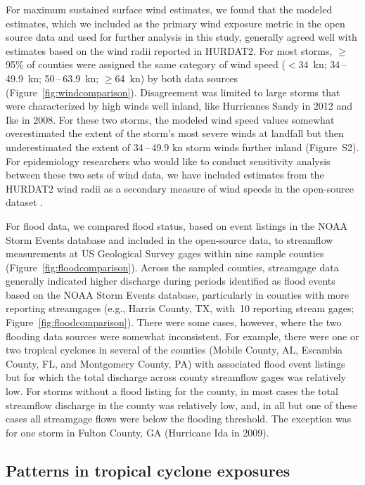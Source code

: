 For maximum sustained surface wind estimates, we found that the modeled
estimates, which we included as the primary wind exposure metric in the open
source data and used for further analysis in this study, generally agreed well
with estimates based on the wind radii reported in \ac{HURDAT2}. For most
storms, $\ge$95\% of counties were assigned the same category of wind speed
($<$34~\si{\knot}; 34\,--\,49.9~\si{\knot}; 50\,--\,63.9~\si{\knot};
$\ge$64~\si{\knot}) by both data sources (Figure~\ref{fig:windcomparison}).
Disagreement was limited to large storms that were characterized by high winds
well inland, like Hurricanes Sandy in 2012 and Ike in 2008. For these two
storms, the modeled wind speed values somewhat overestimated the extent of the
storm's most severe winds at landfall but then underestimated the extent of
34\,--\,49.9 \si{\knot} storm winds further inland (Figure~S2). For
epidemiology researchers who would like to conduct sensitivity analysis
between these two sets of wind data, we have included estimates from the
\ac{HURDAT2} wind radii as a secondary measure of wind speeds in the
open-source dataset \parencite{hurricaneexposuredata}.

For flood data, we compared flood status, based on event listings in the NOAA
Storm Events database and included in the open-source data, to streamflow
measurements at \ac{US} Geological Survey gages within nine sample counties
(Figure~\ref{fig:floodcomparison}). Across the sampled counties, streamgage
data generally indicated higher discharge during periods identified as flood
events based on the NOAA Storm Events database, particularly in counties with
more reporting streamgages (e.g., Harris County, TX, with~10 reporting stream
gages; Figure~\ref{fig:floodcomparison}). There were some cases, however, where
the two flooding data sources were somewhat inconsistent.  For example, there
were one or two tropical cyclones in several of the counties (Mobile County,
AL, Escambia County, FL, and Montgomery County, PA) with associated flood event
listings but for which the total discharge across county streamflow gages was
relatively low. For storms without a flood listing for the county, in most
cases the total streamflow discharge in the county was relatively low, and, in
all but one of these cases all streamgage flows were below the flooding
threshold. The exception was for one storm in Fulton County, GA (Hurricane Ida
in 2009). 

\subsection*{Patterns in tropical cyclone exposures}

